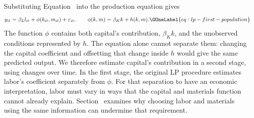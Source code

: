 Substituting Equation~ into the production equation gives
\begin{equation}
y_{it}=\beta_Ll_{it}+\phi(k_{it},m_{it})+\varepsilon_{it},\qquad
\phi(k,m)=\beta_Kk+h(k,m).
\GOneLabel{eq:lp-first-population}
\end{equation}
The function $\phi$ contains both capital's contribution, $\beta_Kk$, and the unobserved conditions represented by $h$. The equation alone cannot separate them: changing the capital coefficient and offsetting that change inside $h$ would give the same predicted output. We therefore estimate capital's contribution in a second stage, using changes over time. In the first stage, the original LP procedure estimates labor's coefficient separately from $\phi$. For that separation to have an economic interpretation, labor must vary in ways that the capital and materials function cannot already explain. Section~ examines why choosing labor and materials using the same information can undermine that requirement.

